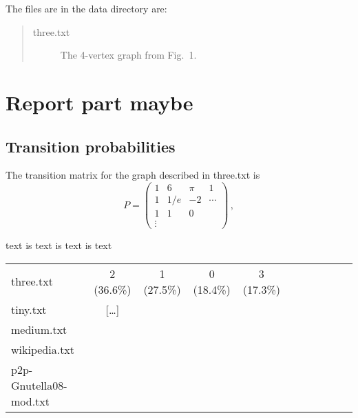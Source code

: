 \documentclass{tufte-handout}
\begin{document}
The files are in the data directory are:
\begin{quotation}
\begin{description}
\item[three.txt] The 4-vertex graph from Fig.~1.
\end{description}
\end{quotation}

\section{Report part maybe}

\subsection{Transition probabilities}

The transition matrix for the graph described in three.txt
is
\begin{equation*}
P = 
\left(
\begin{array}{cccc}
1 & 6 & \pi & 1\\
1 & 1/e & -2  & \cdots\\
1 & 1 & 0 \\
\vdots
\end{array}
\right)\,,
\end{equation*}

\noindent text is text is text is text

\medskip
\begin{fullwidth}
\small
\begin{tabular}{lcccccccccc}
three.txt & 2 (36.6\%) & 1 (27.5\%) & 0 (18.4\%) & 3 (17.3\%) \\
tiny.txt & [\ldots] &\\
medium.txt &\\
wikipedia.txt & \\
p2p-Gnutella08-mod.txt &
\end{tabular}
\end{fullwidth}
\end{document}
